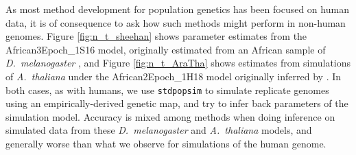 \documentclass[12pt,halfline,a4paper]{ouparticle}
\newcommand{\stdpopsim}{\texttt{stdpopsim}\xspace}
\begin{document}
As most method development for population genetics has been focused on human
data, it is of consequence to ask how such methods might perform in non-human
genomes. Figure \ref{fig:n_t_sheehan} shows parameter estimates from the African3Epoch\_1S16
model, originally estimated from an African sample of \textit{D.~melanogaster} \citep{sheehan2016deep},
and Figure \ref{fig:n_t_AraTha} shows estimates from simulations of \textit{A.~thaliana}
under the African2Epoch\_1H18 model originally inferred by \cite{huber2018gene}.
In both cases, as with humans, we use \stdpopsim to simulate replicate genomes using an empirically-derived genetic map,
and try to infer back parameters of the simulation model.
Accuracy is mixed among methods when doing inference on simulated data from these \textit{D.~melanogaster}
and \textit{A.~thaliana} models, and generally worse than what we
observe for simulations of the human genome.
\end{document}
